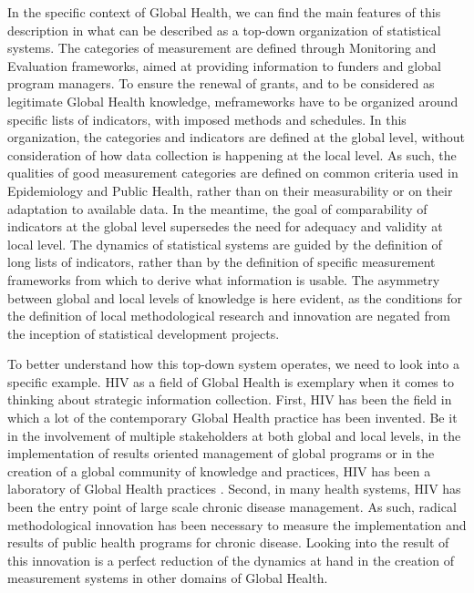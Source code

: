 In the specific context of Global Health, we can find the main features of this description in what can be described as a top-down organization of statistical systems. The categories of measurement are defined through Monitoring and Evaluation frameworks, aimed at providing information to funders and global program managers. To ensure the renewal of grants, and to be considered as legitimate Global Health knowledge, \gls{me}frameworks have to be organized around specific lists of indicators, with imposed methods and schedules. In this organization, the categories and indicators are defined at the global level, without consideration of how data collection is happening at the local level. As such, the qualities of good measurement categories are defined on common criteria used in Epidemiology and Public Health, rather than on their measurability or on their adaptation to available data. In the meantime, the goal of comparability of indicators at the global level supersedes the need for adequacy and validity at local level. The dynamics of statistical systems are guided by the definition of long lists of indicators, rather than by the definition of specific measurement frameworks from which to derive what information is usable. The asymmetry between global and local levels of knowledge is here evident, as the conditions for the definition of local methodological research and innovation are negated from the inception of statistical development projects.

To better understand how this top-down system operates, we need to look into a specific example. HIV as a field of Global Health is exemplary when it comes to thinking about strategic information collection. First, HIV has been the field in which a lot of the contemporary Global Health practice has been invented. Be it in the involvement of multiple stakeholders at both global and local levels, in the implementation of results oriented management of global programs or in the creation of a global community of knowledge and practices, HIV has been a laboratory of Global Health practices . Second, in many health systems, HIV has been the entry point of large scale chronic disease management. As such, radical methodological innovation has been necessary to measure the implementation and results of public health programs for chronic disease. Looking into the result of this innovation is a perfect reduction of the dynamics at hand in the creation of measurement systems in other domains of Global Health.

